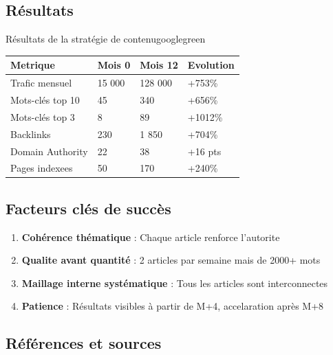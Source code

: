 \documentclass[12pt,a4paper,twoside]{report}
\begin{document}
\subsection{Résultats}

\begin{mybox}{Résultats de la stratégie de contenu}{googlegreen}
\begin{tabular}{llll}
    \toprule
    \textbf{Metrique} & \textbf{Mois 0} & \textbf{Mois 12} & \textbf{Evolution} \\
    \midrule
    Trafic mensuel     & 15 000          & 128 000          & +753\% \\
    Mots-clés top 10   & 45              & 340              & +656\% \\
    Mots-clés top 3    & 8               & 89               & +1012\% \\
    Backlinks          & 230             & 1 850            & +704\% \\
    Domain Authority   & 22              & 38               & +16 pts \\
    Pages indexees     & 50              & 170              & +240\% \\
    \bottomrule
\end{tabular}
\end{mybox}

\subsection{Facteurs clés de succès}
\begin{enumerate}
    \item \textbf{Cohérence thématique} : Chaque article renforce l'autorite
    \item \textbf{Qualite avant quantité} : 2 articles par semaine mais de 2000+ mots
    \item \textbf{Maillage interne systématique} : Tous les articles sont interconnectes
    \item \textbf{Patience} : Résultats visibles à partir de M+4, accelaration après M+8
\end{enumerate}

\subsection{Références et sources}
\end{document}
